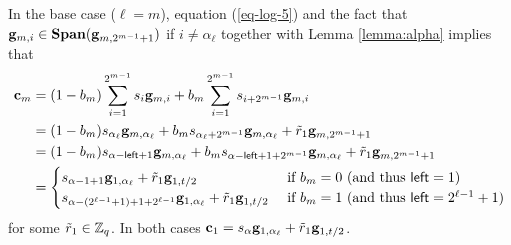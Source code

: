 In the base case ($\ell=m$), equation (\ref{eq-log-5}) and the fact that \(\mathbf{g}_{m,i}\in\mathbf{Span}(\mathbf{g}_{m,2^{m-1}+1})\) if \(i\neq \alpha_\ell\) together with Lemma \ref{lemma:alpha} implies that 
\begin{align*}
\mathbf{c}_m &= (1-b_m)\sum_{i=1}^{2^{m-1}}s_i \mathbf{g}_{m,i}+b_m\sum_{i=1}^{2^{m-1}}s_{i+2^{m-1}}\mathbf{g}_{m,i}\\
&= (1-b_m)s_{\alpha_\ell}\mathbf{g}_{m,\alpha_\ell} +b_ms_{\alpha_\ell+2^{m-1}}\mathbf{g}_{m,\alpha_\ell}+\tilde{r}_1\mathbf{g}_{m,2^{m-1}+1}\\
&= (1-b_m)s_{\alpha-{\mathsf{left}}+1}\mathbf{g}_{m,\alpha_\ell} +b_ms_{\alpha-{\mathsf{left}}+1+2^{m-1}}\mathbf{g}_{m,\alpha_\ell}+\tilde{r}_1\mathbf{g}_{m,2^{m-1}+1}\\
&=\begin{cases}
    s_{\alpha-1+1}\mathbf{g}_{1,\alpha_\ell}+\tilde{r}_1\mathbf{g}_{1,t/2} & \text{ if } b_m=0 \ (\text{and thus }{\mathsf{left}}=1) \\
    s_{\alpha-(2^{\ell-1}+1)+1+2^{\ell-1}}\mathbf{g}_{1,\alpha_\ell}+\tilde{r}_1\mathbf{g}_{1,t/2} & \text{ if } b_m=1 \ (\text{and thus }{\mathsf{left}}=2^{\ell-1}+1) 
\end{cases}
\end{align*}
for some \(\tilde{r}_1\in\mathbb{Z}_q\). In both cases $\mathbf{c}_1=s_\alpha\mathbf{g}_{1,\alpha_\ell}+\tilde{r}_1\mathbf{g}_{1,t/2}$.

